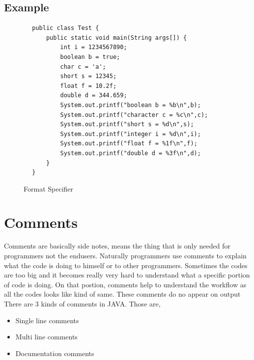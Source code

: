 \documentclass[openany]{book}  %
\begin{document}
\subsection{Example}
\begin{center}
    \begin{verbatim}
        public class Test {
            public static void main(String args[]) {
                int i = 1234567890;
                boolean b = true;
                char c = 'a';
                short s = 12345;
                float f = 10.2f;
                double d = 344.659;
                System.out.printf("boolean b = %b\n",b);
                System.out.printf("character c = %c\n",c);
                System.out.printf("short s = %d\n",s);
                System.out.printf("integer i = %d\n",i);
                System.out.printf("float f = %1f\n",f);
                System.out.printf("double d = %3f\n",d);
            }
        }
    \end{verbatim}
\end{center}
% 
% 
\begin{figure}[htbp]
    \begin{center}
        \caption{Format Specifier\cite{Ref5}\cite{Ref3}}
    \end{center}
\end{figure}
% 
%
\section{Comments}
Comments are basically side notes, means the thing that is only needed for programmers not the endusers. Naturally  programmers use comments to explain what the code is doing to himself
or to other programmers. Sometimes the codes are too big and it becomes really very hard to understand what a specific portion of code is doing. On that postion, comments help to understand
the workflow as all the codes looks like kind of same. These comments do no appear on output There are 3 kinds of comments in JAVA. Those are,
\begin{itemize}
    \item Single line comments
    \item Multi line comments
    \item Documentation comments
\end{itemize}
% 
%
\end{document}
